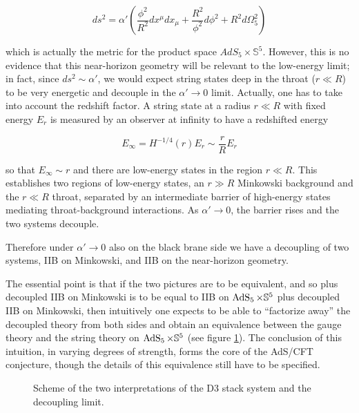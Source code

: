 \begin{equation}
	ds^2 = \alpha' \left( \frac{\phi^2 }{R^2}dx^\mu dx_\mu + \frac{R^2}{\phi^2} d\phi^2 + R^2 d\Omega_5^2 \right)
	\label{}
\end{equation}

which is actually the metric for the product space $AdS_5 \times \mathbb{S}^5$. However, this is no evidence that this near-horizon geometry will be relevant to the low-energy limit; in fact, since $ds^2 \sim \alpha'$, we would expect string states deep in the throat ($r \ll R$) to be very energetic and decouple in the $\alpha' \rightarrow 0$ limit. Actually, one has to take into account the redshift factor. A string state at a radius $r \ll R$ with fixed energy $E_r$ is measured by an observer at infinity to have a redshifted energy

\begin{equation}
	E_\infty = H^{-1/4}(r) E_r \sim \frac{r}{R} E_r
	\label{}
\end{equation}

so that $E_\infty \sim r$ and there are low-energy states in the region $r \ll R$. This establishes two regions of low-energy states, an $r\gg R$ Minkowski background and the $r \ll R$ throat, separated by an intermediate barrier of high-energy states mediating throat-background interactions. As $\alpha' \rightarrow 0$, the barrier rises and the two systems decouple.

Therefore under $\alpha' \rightarrow 0$ also on the black brane side we have a decoupling of two systems, IIB on Minkowski, and IIB on the near-horizon geometry.

The essential point is that if the two pictures are to be equivalent, and so \SYM  plus decoupled IIB on Minkowski is to be equal to IIB on $\operatorname{AdS}_{5} \times \mathbb{S}^5$ plus decoupled IIB on Minkowski, then intuitively one expects to be able to ``factorize away'' the decoupled theory from both sides and obtain an equivalence between the gauge theory and the string theory on $\operatorname{AdS}_{5} \times \mathbb{S}^5$ (see figure \ref{fig:decoupling}). The conclusion of this intuition, in varying degrees of strength, forms the core of the AdS/CFT conjecture, though the details of this equivalence still have to be specified.

\begin{figure}[H]
\centering
\def\svgwidth{400pt}
\captionsetup{width=0.8\textwidth}

\caption{Scheme of the two interpretations of the D3 stack system and the decoupling limit.}
\label{fig:decoupling}
\end{figure}

